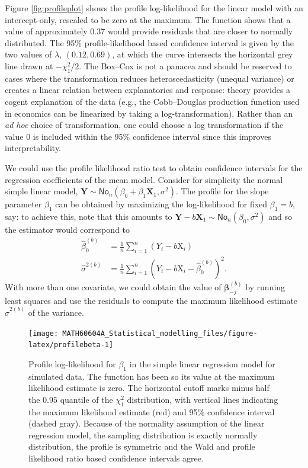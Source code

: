 \documentclass[
  11pt,
  letterpaper,
]{book}
\theoremstyle{definition}
\theoremstyle{definition}
\theoremstyle{definition}
\theoremstyle{remark}
\begin{document}
Figure \ref{fig:profileplot} shows the profile log-likelihood for the linear model with an intercept-only, rescaled to be zero at the maximum. The function shows that a value of approximately \(0.37\) would provide residuals that are closer to normally distributed. The 95\% profile-likelihood based confidence interval is given by the two values of \(\lambda\), \((0.12, 0.69)\), at which the curve intersects the horizontal grey line drawn at \(-\chi^2_1/2\). The Box--Cox is not a panacea and should be reserved to cases where the transformation reduces heteroscedasticity (unequal variance) or creates a linear relation between explanatories and response: theory provides a cogent explanation of the data (e.g., the Cobb--Douglas production function used in economics can be linearized by taking a log-transformation). Rather than an \emph{ad hoc} choice of transformation, one could choose a log transformation if the value \(0\) is included within the 95\% confidence interval since this improves interpretability.

We could use the profile likelihood ratio test to obtain confidence intervals for the regression coefficients of the mean model. Consider for simplicity the normal simple linear model, \(\boldsymbol{Y} \sim \mathsf{No}_n(\beta_0 + \beta_1\mathbf{X}_1, \sigma^2)\). The profile for the slope parameter \(\beta_1\) can be obtained by maximizing the log-likelihood for fixed \(\beta_1=b\), say: to achieve this, note that this amounts to \(\boldsymbol{Y}-b\mathbf{X}_1 \sim \mathsf{No}_n(\beta_0, \sigma^2)\) and so the estimator would correspond to
\begin{align*}
\widehat{\beta}_{0}^{(b)}&=\frac{1}{n} \sum_{i=1}^n (Y_i-b\mathrm{X}_i)\\
\widehat{\sigma}^{2(b)} &= \frac{1}{n}\sum_{i=1}^n \left(Y_i-b\mathrm{X}_i-\widehat{\beta}_{0}^{(b)}\right)^2.
\end{align*}
With more than one covariate, we could obtain the value of \(\boldsymbol{\beta}_{-j}^{(b)}\) by running least squares and use the residuals to compute the maximum likelihood estimate \(\widehat{\sigma}^{2(b)}\) of the variance.

\begin{figure}

{\centering \texttt{[image: MATH60604A\_Statistical\_modelling\_files/figure-latex/profilebeta-1]} 

}

\caption{Profile log-likelihood for $\beta_1$ in the simple linear regression model for simulated data. The function has been so its value at the maximum likelihood estimate is zero. The horizontal cutoff marks minus half the $0.95$ quantile of the $\chi^2_1$ distribution, with vertical lines indicating the maximum likelihood estimate (red) and 95\% confidence interval (dashed gray). Because of the normality assumption of the linear regression model, the sampling distribution is exactly normally distribution, the profile is symmetric and the Wald and profile likelihood ratio based confidence intervals agree.}\label{fig:profilebeta}
\end{figure}
\end{document}
